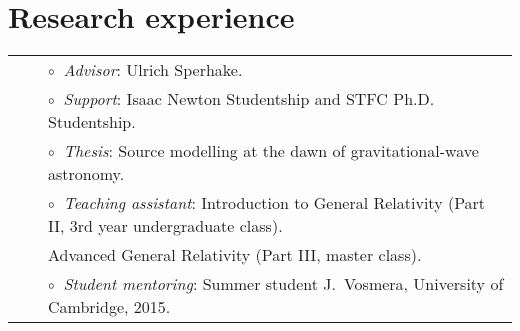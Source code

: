 \documentclass[11pt,a4paper,sans]{moderncv}   %
\begin{document}
\section{Research experience}
%
%
\vspace{-0.1cm}
\begin{tabular}{rcl}
&\hspace{0.4cm} &$\circ\;\;${\textit{Advisor}}: Ulrich Sperhake.\\
&\hspace{0.4cm} &$\circ\;\;${\textit{Support}}: Isaac Newton Studentship and STFC Ph.D. Studentship.\\
&\hspace{0.4cm} &$\circ\;\;${\textit{Thesis}}:  Source modelling at the dawn of gravitational-wave astronomy.\\
&\hspace{0.4cm} &$\circ\;\;${\textit{Teaching assistant}}: Introduction to General Relativity (Part II, 3rd year undergraduate class).\\
&\hspace{0.4cm} &\hspace{3.5cm} Advanced General Relativity (Part III, master class).\\
&\hspace{0.4cm} &$\circ\;\;${\textit{Student mentoring}}: Summer student J.~Vosmera, University of Cambridge, 2015.\\
\end{tabular}
\end{document}
